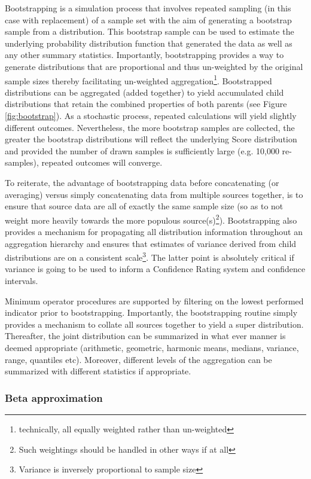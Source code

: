 Bootstrapping is a simulation process that involves repeated sampling (in this case with
replacement) of a sample set with the aim of generating a bootstrap sample from a distribution.
This bootstrap sample can be used to estimate the underlying probability distribution function that
generated the data as well as any other summary statistics.  Importantly, bootstrapping provides a
way to generate distributions that are proportional and thus un-weighted by the original sample
sizes thereby facilitating un-weighted aggregation\footnote{technically, all equally weighted rather
than un-weighted}.  Bootstrapped distributions can be aggregated (added together) to yield
accumulated child distributions that retain the combined properties of both parents (see Figure
\ref{fig:bootstrap}). As a stochastic process, repeated calculations will yield slightly different
outcomes. Nevertheless, the more bootstrap samples are collected, the greater the bootstrap
distributions will reflect the underlying Score distribution and provided the number of drawn
samples is sufficiently large (e.g. 10,000 re-samples), repeated outcomes will converge.

To reiterate, the advantage of bootstrapping data before concatenating (or averaging) versus simply
concatenating data from multiple sources together, is to ensure that source data are all of exactly
the same sample size (so as to not weight more heavily towards the more populous
source(s)\footnote{Such weightings should be handled in other ways if at all}).  Bootstrapping also
provides a mechanism for propagating all distribution information throughout an aggregation
hierarchy and ensures that estimates of variance derived from child distributions are on a
consistent scale\footnote{Variance is inversely proportional to sample size}. The latter point is
absolutely critical if variance is going to be used to inform a Confidence Rating system and
confidence intervals.

Minimum operator procedures are supported by filtering on the lowest performed indicator prior to
bootstrapping. Importantly, the bootstrapping routine simply provides a mechanism to collate all
sources together to yield a super distribution. Thereafter, the joint distribution can be summarized
in what ever manner is deemed appropriate (arithmetic, geometric, harmonic means, medians, variance,
range, quantiles etc). Moreover, different levels of the aggregation can be summarized with
different statistics if appropriate.

\subsubsection{Beta approximation}

